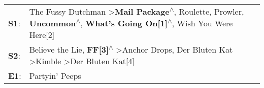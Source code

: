 \begin{supertabular}{p{0.03\textwidth}p{0.92\textwidth}}
 \textbf{S1}:  &  The Fussy Dutchman\textsuperscript{} \textgreater \enspace \textbf{Mail Package\textsuperscript{$\wedge$}}, \enspace Roulette\textsuperscript{}, \enspace Prowler\textsuperscript{}, \enspace \textbf{Uncommon\textsuperscript{$\wedge$}}, \enspace \textbf{What's Going On[1]\textsuperscript{$\wedge$}}, \enspace Wish You Were Here[2]\textsuperscript{}  \enspace  \\
 \textbf{S2}:  &                                                                Believe the Lie\textsuperscript{}, \enspace \textbf{FF[3]\textsuperscript{$\wedge$}} \textgreater \enspace Anchor Drops\textsuperscript{}, \enspace Der Bluten Kat\textsuperscript{} \textgreater \enspace Kimble\textsuperscript{} \textgreater \enspace Der Bluten Kat[4]\textsuperscript{}  \enspace  \\
 \textbf{E1}:  &                                                                                                                                                                                                                                                                                                                             Partyin' Peeps\textsuperscript{}  \enspace  \\
\end{supertabular}
